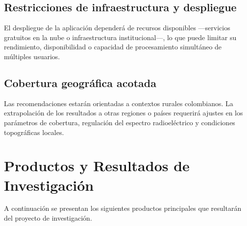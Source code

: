 \subsection{Restricciones de infraestructura y despliegue}
El despliegue de la aplicación dependerá de recursos disponibles
—servicios gratuitos en la nube o infraestructura institucional—,
lo que puede limitar su rendimiento, disponibilidad o capacidad
de procesamiento simultáneo de múltiples usuarios.

\subsection{Cobertura geográfica acotada}
Las recomendaciones estarán orientadas a contextos rurales
colombianos. La extrapolación de los resultados a otras regiones
o países requerirá ajustes en los parámetros de cobertura,
regulación del espectro radioeléctrico y condiciones topográficas
locales.


\section{Productos y Resultados de Investigación}

A continuación se presentan los siguientes productos principales que  resultarán
del proyecto de investigación.

